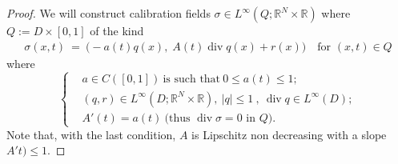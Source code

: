 \documentclass[reqno,11pt]{amsart}
\theoremstyle{definition}
\numberwithin{equation}{section}
\DeclareMathOperator{\Div}{div}
\def\R{\mathbb{R}}
\newcommand{\tinm}[1]{\text{\;#1\;}}
\newcommand{\1}{{{\bf 1}\kern-0,28em\rm l}}
\begin{document}
\begin{proof} We will construct calibration fields $\sigma \in L^\infty(Q; \R^N\times \R)$ where $Q:=D\times [0,1]$ of the kind
\begin{align} \label{specialsig}
\sigma(x,t)\ =\ \Big( -a(t)q(x),\; A(t)\Div q(x) + r(x) \Big) \quad \text{for } (x,t)\in Q
\end{align}
where
\begin{equation}\label{condiA}
\left\{
 \begin{array}{ll}
 &   a\in C([0,1])  \ \text{is such that}\  0 \le a(t)\le 1  ; \\
 &   (q,r)\in L^\infty(D;\R^N\times \R),  \  |q| \le 1\ ,\   \Div q\in L^\infty(D) ;\\
 &   A'(t) = a(t)  \ \text{(thus $\Div \sigma =0$ in $Q$).} 
\end{array}
\right.
\end{equation}
Note that, with the last condition, $A$ is Lipschitz non decreasing with a slope $A't)\le 1$.
%





\end{proof}
\end{document}
